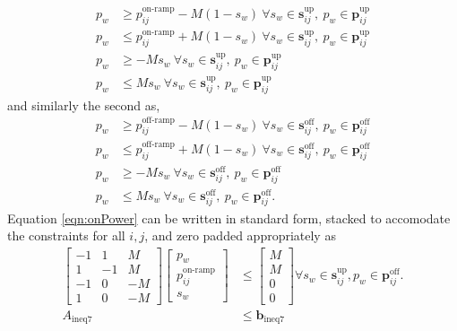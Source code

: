 \begin{equation} \label{eqn:onPower}\begin{aligned}
	p_w &\ge p^{\text{on-ramp}}_{ij} - M(1 - s_w) \ \forall s_w \in \mathbf{s}^{\text{up}}_{ij}, \ p_w \in \mathbf{p}_{ij}^{\text{up}}\\
	p_w &\le p^{\text{on-ramp}}_{ij} + M(1 - s_w) \ \forall s_w \in \mathbf{s}^{\text{up}}_{ij}, \ p_w \in \mathbf{p}_{ij}^{\text{up}}\\
	p_w &\ge -Ms_w \ \forall s_w \in \mathbf{s}^{\text{up}}_{ij}, \ p_w \in \mathbf{p}_{ij}^{\text{up}}\\
	p_w &\le Ms_w \ \forall s_w \in \mathbf{s}^{\text{up}}_{ij}, \ p_w \in \mathbf{p}_{ij}^{\text{up}}
\end{aligned} \end{equation}
and similarly the second as, 
\begin{equation} \label{eqn:offPower} \begin{aligned}
	p_w &\ge p^{\text{off-ramp}}_{ij} - M(1 - s_w) \ \forall s_w \in \mathbf{s}^{\text{off}}_{ij}, \ p_w \in \mathbf{p}_{ij}^{\text{off}}\\
		p_w &\le p^{\text{off-ramp}}_{ij} + M(1 - s_w) \ \forall s_w \in \mathbf{s}^{\text{off}}_{ij}, \ p_w \in \mathbf{p}_{ij}^{\text{off}}\\
		p_w &\ge -Ms_w \ \forall s_w \in \mathbf{s}^{\text{off}}_{ij}, \ p_w \in \mathbf{p}_{ij}^{\text{off}}\\
		p_w &\le Ms_w \ \forall s_w \in \mathbf{s}^{\text{off}}_{ij}, \ p_w \in \mathbf{p}_{ij}^{\text{off}}.
\end{aligned} \end{equation} 
Equation \ref{eqn:onPower} can be written in standard form, stacked to accomodate the constraints for all $i,j$, and zero padded appropriately as
\begin{equation}\begin{aligned} 
	\begin{bmatrix}
		-1 & 1 & M \\
		1  & -1 & M \\
		-1 & 0 & -M \\
		1 & 0 & -M 
	\end{bmatrix}
	\begin{bmatrix} 
		p_w                     \\
	        p_{ij}^{\text{on-ramp}} \\
		s_w
	\end{bmatrix}  &\le
	\begin{bmatrix}
		M \\
		M \\
		0 \\
		0
	\end{bmatrix} \forall s_w \in \mathbf{s}_{ij}^{\text{up}}, p_w \in \mathbf{p}_{ij}^{\text{off}}.\\ 
	A_{\text{ineq7}} &\le \mathbf{b}_{\text{ineq7}} 
\end{aligned}\end{equation}
